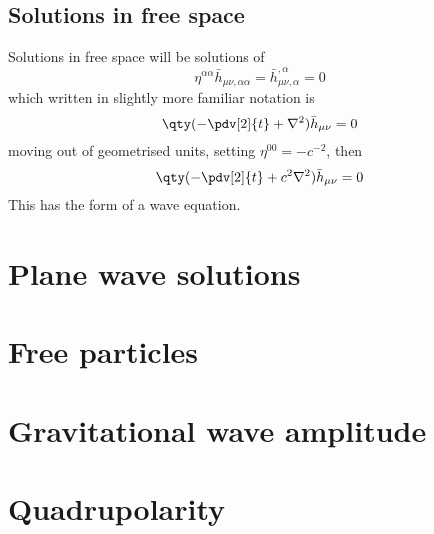 \subsection{Solutions in free space}
\label{sec:solutions-free-space}

Solutions in free space will be solutions of 
\begin{equation}
  \label{eq:14}
   \eta^{\alpha \alpha } \bar{h}_{\mu \nu, \alpha \alpha} = \bar{h}_{\mu \nu, \alpha}^{,\alpha} = 0
\end{equation}
which written in slightly more familiar notation is
\begin{equation}
  \label{eq:15}
  \qty( - \pdv[2]{t} + \nabla^2 ) \bar{h}_{\mu \nu} = 0
\end{equation}
moving out of geometrised units, setting $\eta^{00} = -c^{-2}$, then
\begin{equation}
  \label{eq:16}
   \qty( - \pdv[2]{t} + c^2\nabla^2 ) \bar{h}_{\mu \nu} = 0
\end{equation}
This has the form of a wave equation.

\section{Plane wave solutions}
\label{sec:plane-wave-solutions}

\section{Free particles}
\label{sec:free-particles}

\section{Gravitational wave amplitude}
\label{sec:grav-wave-ampl}

\section{Quadrupolarity}
\label{sec:quadrupolarity}



